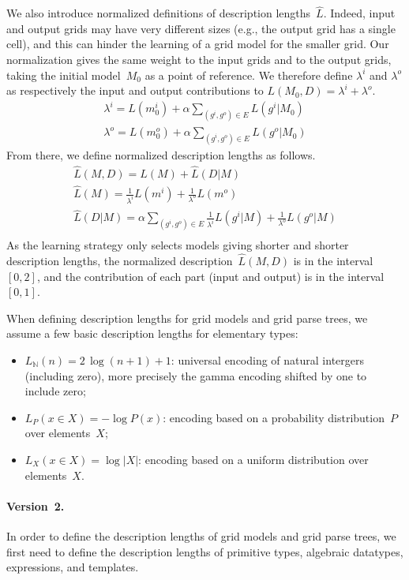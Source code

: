 \documentclass[a4paper]{llncs}
\newcommand{\nat}{\mathbb{N}}
\begin{document}
We also introduce normalized definitions of description
lengths~$\hat{L}$. Indeed, input and output grids may have very
different sizes (e.g., the output grid has a single cell), and this
can hinder the learning of a grid model for the smaller grid. Our
normalization gives the same weight to the input grids and to the
output grids, taking the initial model~$M_0$ as a point of reference.
We therefore define $\lambda^i$ and $\lambda^o$ as respectively the
input and output contributions to $L(M_0,D) = \lambda^i + \lambda^o$.
\begin{align*}
    \lambda^i = L(m^i_0) + \alpha \sum_{(g^i,g^o) \in E} L(g^i|M_0) \\
    \lambda^o = L(m^o_0) + \alpha \sum_{(g^i,g^o) \in E} L(g^o|M_0)
\end{align*}
From there, we define normalized description lengths as follows.
\begin{align*}
  \hat{L}(M,D) = \hat{L}(M) + \hat{L}(D|M) \\
  \hat{L}(M) = \frac{1}{\lambda^i}L(m^i) + \frac{1}{\lambda^o}L(m^o) \\
  \hat{L}(D|M) = \alpha \sum_{(g^i,g^o) \in E} \frac{1}{\lambda^i}L(g^i|M) + \frac{1}{\lambda^o}L(g^o|M) \\
\end{align*}
As the learning strategy only selects models giving shorter and shorter description lengths, the normalized description~$\hat{L}(M,D)$ is in the interval~$[0,2]$, and the contribution of each part (input and output) is in the interval~$[0,1]$.

When defining description lengths for grid models and grid parse
trees, we assume a few basic description lengths for elementary types:
\begin{itemize}
\item $L_\nat(n) = 2\,\log (n+1) + 1$: universal encoding of natural
  intergers (including zero), more precisely the gamma encoding
  shifted by one to include zero;
\item $L_P(x \in X) = -\log P(x)$: encoding based on a probability distribution~$P$ over elements~$X$;
\item $L_X(x \in X) = \log |X|$: encoding based on a uniform distribution over elements~$X$.
\end{itemize}


\paragraph{Version~2.}
In order to define the description lengths of grid models and grid
parse trees, we first need to define the description lengths of
primitive types, algebraic datatypes, expressions, and templates.
\end{document}
